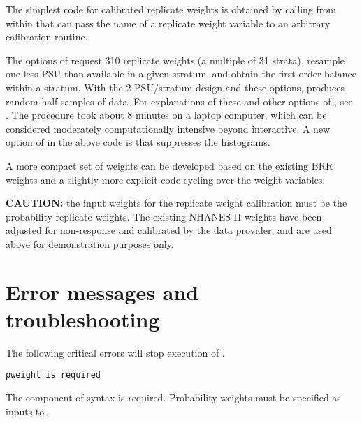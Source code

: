 \begin{stexample}[Example 6]

The simplest code for calibrated replicate weights is obtained by calling
 from within  \citep{kolenikov:2010}
that can pass the name of a replicate weight variable to an arbitrary
calibration routine.

\begin{stlog}
\nullskip
\end{stlog}

The options of  request 310 replicate weights
(a multiple of 31 strata), resample one less PSU than available in
a given stratum, and obtain the first-order balance within a stratum.
With the 2 PSU/stratum design and these options, 
produces random half-samples of data.
For explanations of these and other options of ,
see \citet{kolenikov:2010}. The procedure took about 8 minutes
on a laptop computer, which can be considered moderately
computationally intensive beyond interactive.
A new option of  in the above code is
 that suppresses the histograms.

A more compact set of weights can be developed based on the existing
BRR weights and a slightly more explicit code cycling over the weight
variables:

\begin{stlog}
\nullskip
\end{stlog}

\end{stexample}

{\bf CAUTION:} the input weights for the replicate weight calibration
must be the probability replicate weights. The existing NHANES II weights
have been adjusted for non-response and calibrated by the data provider,
and are used above for demonstration purposes only.

\section{Error messages and troubleshooting}
\label{subsec:tbshooting}

The following critical errors will stop execution of
.

\noindent
{\tt pweight is required}

\morehang
    The \stcmd{[pweight=\ldots]} component of 
    syntax is required. Probability weights must be specified as
    inputs to .

